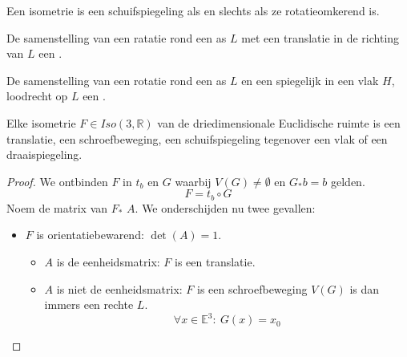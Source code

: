 \documentclass[main.tex]{subfiles}
\begin{document}
\begin{gev}
  \examen
  Een isometrie is een schuifspiegeling als en slechts als ze rotatieomkerend is.
\end{gev}

\begin{de}
  \term
  De samenstelling van een ratatie rond een as $L$ met een translatie in de richting van $L$ een .
\end{de}

\begin{de}
  De samenstelling van een rotatie rond een as $L$ en een spiegelijk in een vlak $H$, loodrecht op $L$ een .
\end{de}

\begin{st}
  \examen
  Elke isometrie $F\in Iso(3,\mathbb{R})$ van de driedimensionale Euclidische ruimte is een translatie, een schroefbeweging, een schuifspiegeling tegenover een vlak of een draaispiegeling.
  \begin{proof}
    We ontbinden $F$ in $t_{b}$ en $G$ waarbij $V(G) \neq \emptyset$ en $G_{*}b = b$ gelden.
    \[F = t_{b} \circ G\]
    Noem de matrix van $F_{*}$ $A$.
    We onderschijden nu twee gevallen:
    \begin{itemize}
    \item $F$ is orientatiebewarend: $\det(A) = 1$.
      \begin{itemize}
      \item $A$ is de eenheidsmatrix: $F$ is een translatie.
      \item $A$ is niet de eenheidsmatrix: $F$ is een schroefbeweging
        $V(G)$ is dan immers een rechte $L$.
        \[ \forall x \in \mathbb{E}^{3}:\ G(x) = x_{0}\]
      \end{itemize}


\end{itemize}
\end{proof}
\end{st}
\end{document}
